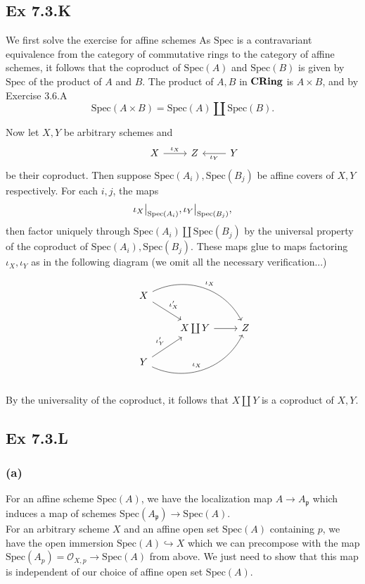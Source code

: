 \documentclass{article}
\newcommand\restr[2]{{%
  \left.\kern-\nulldelimiterspace %
  #1 %
  \vphantom{\big|} %
  \right|_{#2} %
  }}
\theoremstyle{definition}
\newcommand{\Spec}{\text{Spec}}
\newcommand{\catname}[1]{{\normalfont\textbf{#1}}}
\newcommand{\CRing}{\catname{CRing}}
\begin{document}
\subsection*{Ex 7.3.K}

We first solve the exercise for affine schemes As $\Spec$ is a contravariant
equivalence from the category of commutative rings to the category of affine
schemes, it follows that the coproduct of $\Spec(A)$ and $\Spec(B)$ is given by
$\Spec$ of the product of $A$ and $B$. The product of $A, B$ in $\CRing$ is $A
	\times B$, and by Exercise 3.6.A
\[
	\Spec(A \times B) = \Spec(A) \coprod \Spec(B).
\]

Now let $X, Y$ be arbitrary schemes and
\[
	\begin{tikzcd}
		& X
		\ar[r, "\iota_X"]
		& Z
		& Y
		\ar[l, "\iota_Y"]
	\end{tikzcd}
\]
be their coproduct. Then suppose $\Spec(A_i), \Spec(B_j)$ be affine covers of
$X, Y$ respectively. For each $i, j$, the maps
\[
	\restr{\iota_X}{\Spec(A_i)},
	\restr{\iota_Y}{\Spec(B_j)},
\]
then factor uniquely through $\Spec(A_i) \coprod \Spec(B_j)$ by the universal
property of the coproduct of $\Spec(A_i), \Spec(B_j)$. These maps glue to maps
factoring $\iota_X, \iota_Y$ as in the following diagram (we omit all the
necessary verification...)
\[
	\begin{tikzcd}
		& X
		\ar[dr, "\iota_X'"]
		\ar[drr, bend left=45, "\iota_X"]
		\\
		&
		& X \coprod Y
		\ar[r]
		& Z \\
		& Y
		\ar[ur, "\iota_Y'"]
		\ar[urr, bend right=45, "\iota_X"]
		\\
	\end{tikzcd}
\]
By the universality of the coproduct, it follows that $X \coprod Y$ is a
coproduct of $X, Y$.

\subsection*{Ex 7.3.L}
\subsubsection*{(a)}

For an affine scheme $\Spec(A)$, we have the localization map $A \to
	A_{\mathfrak{p}}$ which induces a map of schemes $\Spec(A_{\mathfrak{p}}) \to
	\Spec(A)$. \\

For an arbitrary scheme $X$ and an affine open set $\Spec(A)$ containing $p$,
we have the open immersion $\Spec(A) \hookrightarrow X$ which we can precompose
with the map $\Spec(A_p) = \mathcal{O}_{X, p} \to \Spec(A)$ from above. We just need to
show that this map is independent of our choice of affine open set $\Spec(A)$. \\
\end{document}
